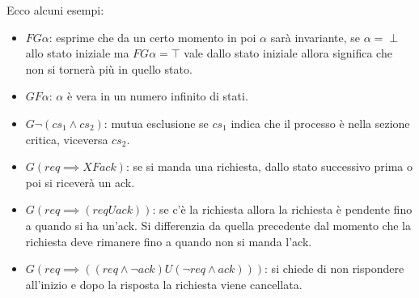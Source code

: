 \begin{esempio}
    Ecco alcuni esempi:
    \begin{itemize}
        \item $FG\alpha$: esprime che da un certo momento in poi $\alpha$ sarà
              invariante, se $\alpha = \perp$ allo stato iniziale ma $FG\alpha =
                  \top$ vale dallo stato iniziale allora significa che non si
              tornerà più in quello stato.
        \item $GF\alpha$: $\alpha$ è vera in un numero infinito di stati.
        \item $G\lnot (cs_1\land cs_2)$: mutua esclusione se $cs_1$ indica che il
              processo è nella sezione critica, viceversa $cs_2$.
        \item $G(req \implies XF ack)$: se si manda una richiesta, dallo stato
              successivo prima o poi si riceverà un ack.
        \item $G(req \implies (req U ack))$: se c'è la richiesta allora la
              richiesta è pendente fino a quando si ha un'ack. Si differenzia da
              quella precedente dal momento che la richiesta deve rimanere fino
              a quando non si manda l'ack.
        \item $G(req \implies ((req\land \lnot ack) U (\lnot req \land ack)))$:
              si chiede di non rispondere all'inizio e dopo la risposta la richiesta
              viene cancellata.
    \end{itemize}
\end{esempio}
